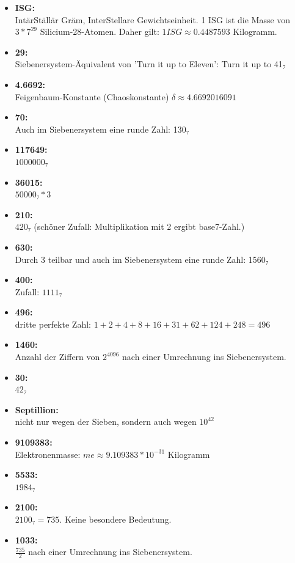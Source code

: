 \begin{itemize}
	\item \textbf{ISG:}\\ IntärStällär Gräm, InterStellare Gewichtseinheit. 1 ISG ist die Masse von $3*7^{29}$ Silicium-28-Atomen. Daher gilt: $1 ISG ≈ 0.4487593$ Kilogramm.
	\item \textbf{29:}\\ Siebenersystem-Äquivalent von 'Turn it up to Eleven': Turn it up to 41₇
	\item \textbf{4.6692:}\\ Feigenbaum-Konstante (Chaoskonstante) $δ ≈ 4.6692016091$
	\item \textbf{70:}\\ Auch im Siebenersystem eine runde Zahl: 130₇
	\item \textbf{117649:}\\ $1000000₇$
	\item \textbf{36015:}\\ $50000₇ * 3$
	\item \textbf{210:}\\ $420₇$ (schöner Zufall: Multiplikation mit 2 ergibt base7-Zahl.) 
	\item \textbf{630:}\\ Durch 3 teilbar und auch im Siebenersystem eine runde Zahl: 1560₇
	\item \textbf{400:}\\ Zufall: $1111₇$
	\item \textbf{496:}\\ dritte perfekte Zahl: $1+2+4+8+16+31+62+124+248 = 496$
	\item \textbf{1460:}\\ Anzahl der Ziffern von $2^{4096}$ nach einer Umrechnung ins Siebenersystem. 
	\item \textbf{30:}\\ $42₇$
	\item \textbf{Septillion:}\\ nicht nur wegen der Sieben, sondern auch wegen $10^{42}$
	\item \textbf{9109383:}\\ Elektronenmasse: $me ≈ 9.109383*10^{-31}$ Kilogramm
	\item \textbf{5533:}\\ $1984₇$
	\item \textbf{2100:}\\ $2100₇ = 735$. Keine besondere Bedeutung.
	\item \textbf{1033:}\\ $\frac{735}{2}$ nach einer Umrechnung ins Siebenersystem.
\end{itemize}


